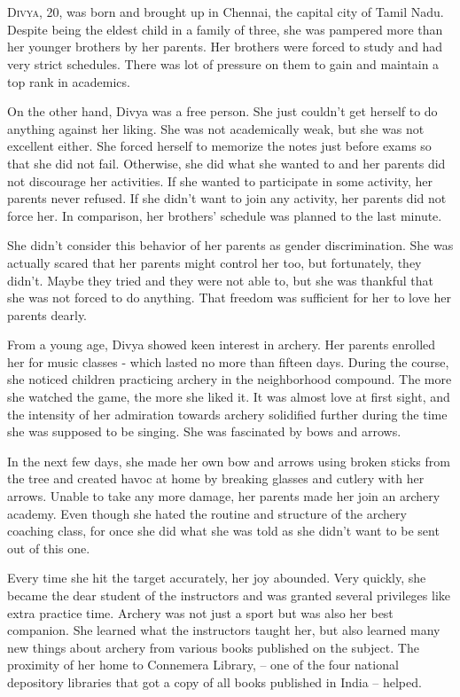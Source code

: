 \chapter{}

\lettrine{D}{ivya}, 20, was born and brought up in Chennai, the capital city of Tamil Nadu.
Despite being the eldest child in a family of three, she was pampered more than
her younger brothers by her parents. Her brothers were forced to study and had
very strict schedules. There was lot of pressure on them to gain and maintain a
top rank in academics.

On the other hand, Divya was a free person. She just couldn't get herself to do
anything against her liking. She was not academically weak, but she was not
excellent either. She forced herself to memorize the notes just before exams so
that she did not fail. Otherwise, she did what she wanted to and her parents did
not discourage her activities. If she wanted to participate in some activity,
her parents never refused. If she didn't want to join any activity, her parents
did not force her. In comparison, her brothers' schedule was planned to the last
minute.

She didn't consider this behavior of her parents as gender discrimination. She
was actually scared that her parents might control her too, but fortunately,
they didn't. Maybe they tried and they were not able to, but she was thankful
that she was not forced to do anything. That freedom was sufficient for her to
love her parents dearly.

From a young age, Divya showed keen interest in archery. Her parents enrolled
her for music classes - which lasted no more than fifteen days. During the
course, she noticed children practicing archery in the neighborhood compound.
The more she watched the game, the more she liked it. It was almost love at
first sight, and the intensity of her admiration towards archery solidified
further during the time she was supposed to be singing. She was fascinated by
bows and arrows.

In the next few days, she made her own bow and arrows using broken sticks from
the tree and created havoc at home by breaking glasses and cutlery with her
arrows. Unable to take any more damage, her parents made her join an archery
academy. Even though she hated the routine and structure of the archery coaching
class, for once she did what she was told as she didn't want to be sent out of
this one.

Every time she hit the target accurately, her joy abounded. Very quickly, she
became the dear student of the instructors and was granted several privileges
like extra practice time. Archery was not just a sport but was also her best
companion. She learned what the instructors taught her, but also learned many
new things about archery from various books published on the subject. The
proximity of her home to Connemera Library, – one of the four national
depository libraries that got a copy of all books published in India – helped.

